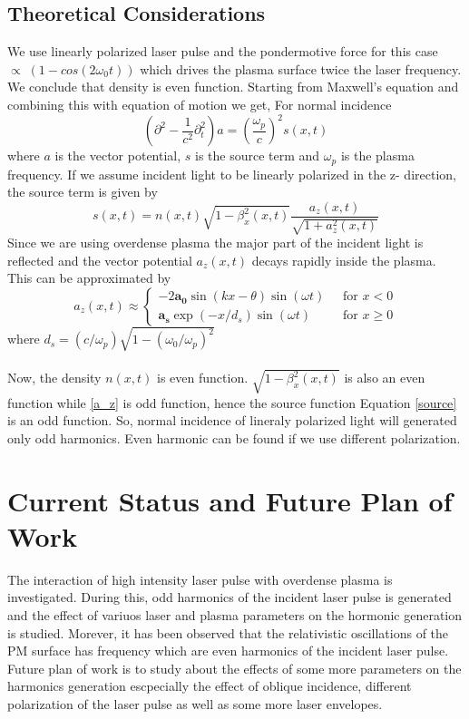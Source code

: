 \documentclass[12pt]{article}
\newenvironment{changemargin}[2]{
\begin{list}{}{
\setlength{\topsep}{0pt}
\setlength{\leftmargin}{#1}
\setlength{\rightmargin}{#2}
\setlength{\listparindent}{\parindent}
\setlength{\itemindent}{\parindent}
\setlength{\parsep}{\parskip}
}
\item[]}{\end{list}}
\begin{document}
\begin{changemargin}{-2cm}{-2cm}
    \subsection{Theoretical Considerations}
    We use linearly polarized laser pulse and the pondermotive force for this case $\propto \; (1-cos(2\omega_0t))$ which drives the plasma surface twice the laser frequency. We conclude that density is even function.
    Starting from Maxwell's  equation and combining this with equation of motion we get, For normal incidence
    \begin{equation}
        \left (\partial^2 - \frac{1}{c^2}\partial_t^2\right )a = \left (\frac{\omega_p}{c}\right )^2s(x,t)
    \end{equation}
    where $a$ is the vector potential, $s$ is the source term and $\omega_p$ is the plasma frequency. If we assume incident light to be linearly polarized in the z- direction, the source term is given by
    \begin{equation}\label{source}
        s(x,t) = n(x,t)\sqrt{1-\beta_x^2(x,t)}\frac{a_z(x,t)}{\sqrt{1+a_z^2(x,t)}}
    \end{equation}
    Since we are using overdense plasma the major part of the incident light is reflected and the vector potential $a_z(x,t)$  decays rapidly inside the plasma. This can be  approximated by
    \begin{equation}\label{a_z}
        a_z(x,t) \approx \begin{cases}
            -2\mathbf{a_0}\sin(kx-\theta)\sin(\omega t) \; & \text{ for } x < 0   \\
            \mathbf{a_s}\exp(-x/d_s)\sin(\omega t)  \;     & \text{ for } x \ge 0
        \end{cases}
    \end{equation}
    where $d_s = (c/\omega_p)\sqrt{1-(\omega_0 / \omega_p)^2}$\\ \\
    Now, the density $n(x,t)$ is even function. $\sqrt{1-\beta_x^2(x,t)}$ is also an even function while \ref{a_z} is odd function, hence the source function Equation \ref{source} is an odd function. So, normal incidence of lineraly polarized light will generated only odd harmonics. Even harmonic can be found if we use different polarization. \cite{lichters}

    \section{Current Status and Future Plan of Work}
    The interaction of high intensity laser pulse with overdense plasma is investigated. During this, odd harmonics of the incident laser pulse is generated and the effect of variuos laser and plasma parameters on the hormonic generation is studied. Morever, it has been observed that the relativistic oscillations of the PM surface has frequency which are even harmonics of the incident laser pulse. Future plan of work is to study about the effects of some more parameters on the harmonics generation escpecially the effect of oblique incidence, different polarization of the laser pulse as well as some more laser envelopes.


\end{changemargin}
\end{document}

